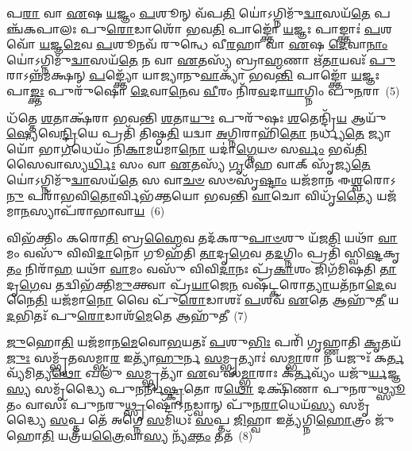 {\anuvakamend[{𑌅𑌶𑍀᳴𑌯\-\ul{𑌤} 𑌤𑌤𑍍 𑌤𑍇\-\ul{𑌨} 𑌵𑍇𑌦᳴ \ul{𑌦}\-𑌰𑍍𑌭𑍈𑌃 𑌪𑌞𑍍𑌚᳴𑌵𑌿𑍞𑌶𑌤𑌿𑌶𑍍𑌚}]}%

𑌪\-\ul{𑌰𑌾} 𑌵𑌾 \ul{𑌏}\-𑌷 \ul{𑌯}\-𑌜𑍍𑌞𑌂 \ul{𑌪}\-𑌶𑍂𑌨𑍍 𑌵᳴𑌪\-\ul{𑌤𑌿} 𑌯𑍋॑\-𑌽𑌗𑍍𑌨𑌿𑌮𑍁᳴\-\ul{𑌦𑍍𑌵𑌾}\-𑌸𑌯᳴\-\ul{𑌤𑍇} 𑌪𑌞𑍍𑌚᳴𑌕𑌪𑌾𑌲𑌃 𑌪𑍁\-\ul{𑌰𑍋}\-𑌡𑌾𑌶𑍋᳴ 𑌭𑌵\-\ul{𑌤𑌿} 𑌪𑌾𑌙𑍍𑌕𑍍𑌤𑍋᳴ \ul{𑌯}\-𑌜𑍍𑌞𑌃 𑌪𑌾𑌙𑍍𑌕𑍍𑌤𑌾𑌃॑ \ul{𑌪}\-𑌶𑌵𑍋᳴ \ul{𑌯}\-𑌜𑍍𑌞\-\ul{𑌮𑍇}\-𑌵 \ul{𑌪}\-𑌶𑍂𑌨𑌵᳴ 𑌰𑍁𑌨𑍍𑌧𑍇 𑌵𑍀\-\ul{𑌰}\-𑌹𑌾 𑌵𑌾 \ul{𑌏}\-𑌷 \ul{𑌦𑍇}\-𑌵𑌾\-\ul{𑌨𑌾𑌂} 𑌯𑍋॑\-𑌽𑌗𑍍𑌨𑌿𑌮𑍁᳴\-\ul{𑌦𑍍𑌵𑌾}\-𑌸𑌯᳴\-\ul{𑌤𑍇} 𑌨 𑌵𑌾 \ul{𑌏}\-𑌤𑌸𑍍𑌯᳴ 𑌬𑍍𑌰𑌾\-\ul{𑌹𑍍𑌮}\-𑌣𑌾 𑌋᳴\-\ul{𑌤𑌾}\-𑌯𑌵𑌃᳴ \ul{𑌪𑍁}\-𑌰𑌾\-𑌽𑌨𑍍𑌨᳴𑌮𑌕𑍍𑌷𑌨𑍍 \ul{𑌪}\-𑌙𑍍𑌕𑍍𑌤𑍍𑌯𑍋᳴ 𑌯𑌾𑌜𑍍𑌯𑌾𑌨𑍁\-\ul{𑌵𑌾}\-𑌕𑍍𑌯𑌾᳴ 𑌭𑌵\-\ul{𑌨𑍍𑌤𑌿} 𑌪𑌾𑌙𑍍𑌕𑍍𑌤𑍋᳴ \ul{𑌯}\-𑌜𑍍𑌞𑌃 𑌪𑌾\-\ul{𑌙𑍍𑌕𑍍𑌤𑌃} 𑌪𑍁𑌰𑍁᳴𑌷𑍋 \ul{𑌦𑍇}\-𑌵𑌾\-\ul{𑌨𑍇}\-𑌵 \ul{𑌵𑍀}\-𑌰𑌂 𑌨𑌿᳴𑌰\-\ul{𑌵}\-𑌦𑌾\-\ul{𑌯𑌾}\-𑌗𑍍𑌨𑌿𑌂 𑌪𑍁\-\ul{𑌨}\-𑌰𑌾~(5)

𑌧᳴𑌤𑍍𑌤𑍇 \ul{𑌶}\-𑌤𑌾𑌕𑍍𑌷᳴𑌰𑌾 𑌭𑌵𑌨𑍍𑌤𑌿 \ul{𑌶}\-𑌤𑌾\-\ul{𑌯𑍁𑌃} 𑌪𑍁𑌰𑍁᳴𑌷𑌃 \ul{𑌶}\-𑌤𑍇𑌨𑍍𑌦𑍍𑌰𑌿᳴\-\ul{𑌯} 𑌆𑌯𑍁᳴\-\ul{𑌷𑍍𑌯𑍇}\-𑌵𑍇\-\ul{𑌨𑍍𑌦𑍍𑌰𑌿}\-𑌯𑍇 𑌪𑍍𑌰𑌤𑌿᳴ 𑌤𑌿𑌷𑍍𑌠\-\ul{𑌤𑌿} 𑌯𑌦𑍍𑌵𑌾 \ul{𑌅}\-𑌗𑍍𑌨𑌿𑌰𑌾𑌹𑌿᳴\-\ul{𑌤𑍋} 𑌨𑌰𑍍𑌧𑍍𑌯\-\ul{𑌤𑍇} 𑌜𑍍𑌯𑌾𑌯𑍋᳴ 𑌭𑌾\-\ul{𑌗}\-𑌧𑍇𑌯𑌂᳴ 𑌨𑌿\-\ul{𑌕𑌾}\-𑌮𑌯᳴𑌮𑌾\-\ul{𑌨𑍋} 𑌯𑌦𑌾॑\-\ul{𑌗𑍍𑌨𑍇}\-𑌯𑍞 𑌸\-\ul{𑌰𑍍𑌵𑌂} 𑌭𑌵᳴\-\ul{𑌤𑌿} 𑌸𑍈𑌵𑌾𑌸𑍍𑌯\-\ul{𑌰𑍍𑌧𑌿𑌃} 𑌸𑌂 𑌵𑌾 \ul{𑌏}\-𑌤𑌸𑍍𑌯᳴ \ul{𑌗𑍃}\-𑌹𑍇 𑌵𑌾𑌕𑍍 𑌸𑍃᳴𑌜𑍍𑌯\-\ul{𑌤𑍇} 𑌯𑍋॑\-𑌽𑌗𑍍𑌨𑌿𑌮𑍁᳴\-\ul{𑌦𑍍𑌵𑌾}\-𑌸𑌯᳴\-\ul{𑌤𑍇} 𑌸 𑌵𑌾\-\ul{𑌚}\-\-\ul{𑍞} 𑌸𑍞𑌸𑍃᳴\-\ul{𑌷𑍍𑌟𑌾𑌂} 𑌯𑌜᳴𑌮𑌾𑌨 𑌈\-\ul{𑌶𑍍𑌵}\-𑌰𑍋\-𑌽\-\ul{𑌨𑍁} 𑌪𑌰𑌾᳴𑌭𑌵𑌿\-\ul{𑌤𑍋}\-𑌰𑍍𑌵𑌿𑌭᳴𑌕𑍍𑌤𑌯𑍋 𑌭𑌵𑌨𑍍𑌤𑌿 \ul{𑌵𑌾}\-𑌚𑍋 𑌵𑌿𑌧𑍃᳴\-\ul{𑌤𑍍𑌯𑍈} 𑌯𑌜᳴𑌮𑌾\-\ul{𑌨}\-𑌸𑍍𑌯𑌾𑌪᳴𑌰𑌾𑌭𑌾𑌵𑌾\-\ul{𑌯}\-~(6)

𑌵𑌿𑌭᳴𑌕𑍍𑌤𑌿𑌂 𑌕𑌰𑍋\-\ul{𑌤𑌿} 𑌬𑍍𑌰\-\ul{𑌹𑍍𑌮𑍈}\-𑌵 𑌤𑌦᳴𑌕𑌰𑍁\-\ul{𑌪𑌾}\-\-\ul{𑍞}\-𑌶𑍁 𑌯᳴𑌜\-\ul{𑌤𑌿} 𑌯𑌥𑌾᳴ \ul{𑌵𑌾}\-𑌮𑌂 𑌵𑌸𑍁᳴ 𑌵𑌿𑌵𑌿\-\ul{𑌦𑌾}\-𑌨𑍋 𑌗𑍂𑌹᳴𑌤𑌿 \ul{𑌤𑌾}\-𑌦𑍃\-\ul{𑌗𑍇}\-𑌵 𑌤\-\ul{𑌦}\-𑌗𑍍𑌨𑌿𑌂 𑌪𑍍𑌰𑌤𑌿᳴ 𑌸𑍍𑌵𑌿\-\ul{𑌷𑍍𑌟}\-𑌕𑍃\-\ul{𑌤𑌂} 𑌨𑌿𑌰𑌾᳴\-\ul{𑌹} 𑌯𑌥𑌾᳴ \ul{𑌵𑌾}\-𑌮𑌂 𑌵𑌸𑍁᳴ 𑌵𑌿𑌵𑌿\-\ul{𑌦𑌾}\-𑌨𑌃 𑌪𑍍𑌰᳴\-\ul{𑌕𑌾}\-𑌶𑌂 𑌜𑌿𑌗᳴𑌮𑌿𑌷𑌤𑌿 \ul{𑌤𑌾}\-𑌦𑍃\-\ul{𑌗𑍇}\-𑌵 𑌤𑌦𑍍𑌵𑌿𑌭᳴𑌕𑍍𑌤𑌿\-\ul{𑌮𑍁}\-𑌕𑍍𑌤𑍍𑌵𑌾 𑌪𑍍𑌰᳴\-\ul{𑌯𑌾}\-𑌜𑍇\-\ul{𑌨} 𑌵𑌷᳴𑌟𑍍𑌕𑌰𑍋\-\ul{𑌤𑍍𑌯𑌾}\-𑌯𑌤᳴𑌨𑌾\-\ul{𑌦𑍇}\-𑌵 𑌨𑍈\-\ul{𑌤𑌿} 𑌯𑌜᳴𑌮𑌾\-\ul{𑌨𑍋} 𑌵𑍈 𑌪𑍁᳴\-\ul{𑌰𑍋}\-𑌡𑌾𑌶𑌃᳴ \ul{𑌪}\-𑌶𑌵᳴ \ul{𑌏}\-𑌤𑍇 𑌆𑌹𑍁᳴\-\ul{𑌤𑍀} 𑌯\-\ul{𑌦}\-𑌭𑌿𑌤𑌃᳴ 𑌪𑍁\-\ul{𑌰𑍋}\-𑌡𑌾𑌶᳴\-\ul{𑌮𑍇}\-𑌤𑍇 𑌆𑌹𑍁᳴𑌤𑍀~(7)

\-\ul{𑌜𑍁}\-𑌹𑍋\-\ul{𑌤𑌿} 𑌯𑌜᳴𑌮𑌾𑌨\-\ul{𑌮𑍇}\-𑌵𑍋\-\ul{𑌭}\-𑌯𑌤𑌃᳴ \ul{𑌪}\-𑌶𑍁\-\ul{𑌭𑌿𑌃} 𑌪𑌰𑌿᳴ 𑌗𑍃𑌹𑍍𑌣𑌾𑌤𑌿 \ul{𑌕𑍃}\-𑌤𑌯᳴\-\ul{𑌜𑍁𑌃} 𑌸𑌮𑍍𑌭𑍃᳴𑌤𑌸𑌮𑍍𑌭𑌾\-\ul{𑌰} 𑌇𑌤𑍍𑌯𑌾᳴\-\ul{𑌹𑍁}\-𑌰𑍍𑌨 \ul{𑌸}\-𑌮𑍍𑌭𑍃𑌤𑍍𑌯𑌾𑌃॑ 𑌸\-\ul{𑌮𑍍𑌭𑌾}\-𑌰𑌾 𑌨 𑌯𑌜𑍁𑌃᳴ 𑌕\-\ul{𑌰𑍍𑌤}\-𑌵𑍍𑌯᳴𑌮𑌿𑌤𑍍𑌯\-\ul{𑌥𑍋} 𑌖𑌲𑍁᳴ \ul{𑌸}\-𑌮𑍍𑌭𑍃𑌤𑍍𑌯𑌾᳴ \ul{𑌏}\-𑌵 𑌸᳴\-\ul{𑌮𑍍𑌭𑌾}\-𑌰𑌾𑌃 𑌕᳴\-\ul{𑌰𑍍𑌤}\-𑌵𑍍𑌯𑌂᳴ 𑌯𑌜𑍁᳴\-\ul{𑌰𑍍𑌯}\-𑌜𑍍𑌞\-\ul{𑌸𑍍𑌯} 𑌸𑌮𑍃᳴𑌦𑍍𑌧𑍍𑌯𑍈 𑌪𑍁𑌨𑌰𑍍𑌨𑌿\-\ul{𑌷𑍍𑌕𑍃}\-𑌤𑍋 𑌰\-\ul{𑌥𑍋} 𑌦𑌕𑍍𑌷𑌿᳴𑌣𑌾 𑌪𑍁𑌨𑌰𑍁\-\ul{𑌥𑍍𑌸𑍍𑌯𑍂}\-𑌤𑌂 𑌵𑌾𑌸𑌃᳴ 𑌪𑍁𑌨𑌰𑍁\-\ul{𑌥𑍍𑌸𑍃}\-𑌷𑍍𑌟𑍋᳴\-𑌽\-\ul{𑌨}\-𑌡𑍍𑌵𑌾𑌨𑍍 𑌪𑍁᳴𑌨\-\ul{𑌰𑌾}\-𑌧𑍇𑌯᳴\-\ul{𑌸𑍍𑌯} 𑌸𑌮𑍃᳴𑌦𑍍𑌧𑍍𑌯𑍈 \ul{𑌸}\-𑌪𑍍𑌤 𑌤𑍇᳴ 𑌅𑌗𑍍𑌨𑍇 \ul{𑌸}\-𑌮𑌿𑌧𑌃᳴ \ul{𑌸}\-𑌪𑍍𑌤 \ul{𑌜𑌿}\-𑌹𑍍𑌵𑌾 𑌇𑌤𑍍𑌯᳴𑌗𑍍𑌨𑌿\-\ul{𑌹𑍋}\-𑌤𑍍𑌰𑌂 𑌜𑍁᳴𑌹𑍋\-\ul{𑌤𑌿} 𑌯𑌤𑍍𑌰᳴𑌯\-\ul{𑌤𑍍𑌰𑍈}\-𑌵𑌾\-\ul{𑌸𑍍𑌯} 𑌨𑍍𑌯᳴\-\ul{𑌕𑍍𑌤𑌂} 𑌤𑌤᳴~(8)

